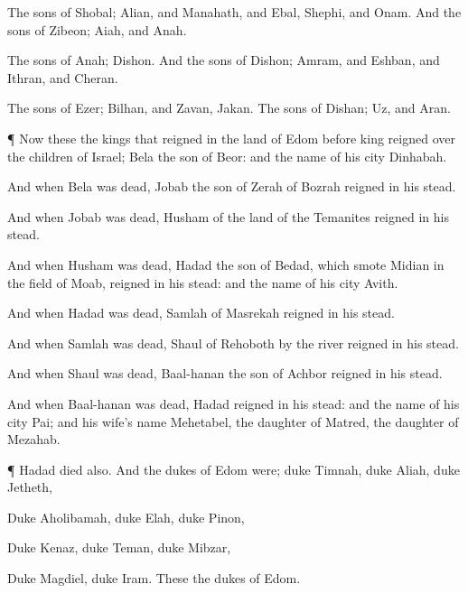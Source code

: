 {The
sons of
Shobal;
Alian, and
Manahath, and
Ebal,
Shephi, and
Onam. And the
sons of
Zibeon;
Aiah, and
Anah.

The
sons of
Anah;
Dishon. And the
sons of
Dishon;
Amram, and
Eshban, and
Ithran, and
Cheran.

The
sons of
Ezer;
Bilhan, and
Zavan,
{}
Jakan. The
sons of
Dishan;
Uz, and
Aran.


\par }{\PP {}¶ Now these
{} the
kings that
reigned in the
land of
Edom
before
{}
king
reigned over the
children of
Israel;
Bela the
son of
Beor: and the
name of his
city
{}
Dinhabah.

And when
Bela was
dead,
Jobab the
son of
Zerah of
Bozrah
reigned in his stead.

And when
Jobab was
dead,
Husham of the
land of the
Temanites
reigned in his stead.

And when
Husham was
dead,
Hadad the
son of
Bedad, which
smote
Midian in the
field of
Moab,
reigned in his stead: and the
name of his
city
{}
Avith.

And when
Hadad was
dead,
Samlah of
Masrekah
reigned in his stead.

And when
Samlah was
dead,
Shaul of
Rehoboth by the
river
reigned in his stead.

And when
Shaul was
dead,
Baal-hanan the
son of
Achbor
reigned in his stead.

And when
Baal-hanan was
dead,
Hadad
reigned in his stead: and the
name of his
city
{}
Pai; and his
wife’s
name
{}
Mehetabel, the
daughter of
Matred, the
daughter of
Mezahab.


\par }{\PP {}¶
Hadad
died also. And the
dukes of
Edom were;
duke
Timnah,
duke
Aliah,
duke
Jetheth,

Duke
Aholibamah,
duke
Elah,
duke
Pinon,

Duke
Kenaz,
duke
Teman,
duke
Mibzar,

Duke
Magdiel,
duke
Iram. These
{} the
dukes of
Edom.




}
